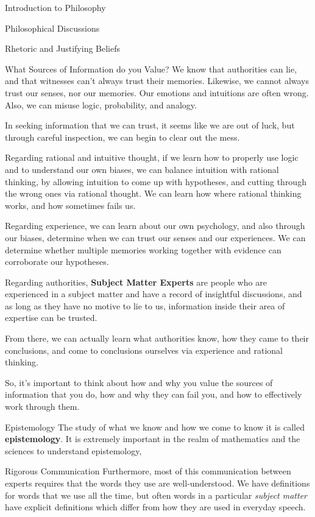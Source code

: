 \begin{chapter}{Introduction to Philosophy}
\begin{section}{Philosophical Discussions}
\begin{subsection}{Rhetoric and Justifying Beliefs}
\begin{subsubsection}{What Sources of Information do you Value?}
                We know that authorities can lie, and that witnesses can't always trust their memories. Likewise, we cannot always trust our senses, nor our memories. Our emotions and intuitions are often wrong. Also, we can misuse logic, probability, and analogy.
                    
                In seeking information that we can trust, it seems like we are out of luck, but through careful inspection, we can begin to clear out the mess.
                        
                Regarding rational and intuitive thought, if we learn how to properly use logic and to understand our own biases, we can balance intuition with rational thinking, by allowing intuition to come up with hypotheses, and cutting through the wrong ones via rational thought. We can learn how where rational thinking works, and how sometimes fails us.
                    
                Regarding experience, we can learn about our own psychology, and also through our biases, determine when we can trust our senses and our experiences. We can determine whether multiple memories working together with evidence can corroborate our hypotheses.
                    
                Regarding authorities, \textbf{Subject Matter Experts} are people who are experienced in a subject matter and have a record of insightful discussions, and as long as they have no motive to lie to us, information inside their area of expertise can be trusted.
                    
                From there, we can actually learn what authorities know, how they came to their conclusions, and come to conclusions ourselves via experience and rational thinking.
                    
                So, it's important to think about how and why you value the sources of information that you do, how and why they can fail you, and how to effectively work through them.
            \end{subsubsection}
                
            \begin{subsubsection}{Epistemology}
                The study of what we know and how we come to know it is called \textbf{epistemology}. It is extremely important in the realm of mathematics and the sciences to understand epistemology, 
            \end{subsubsection}
            \begin{subsubsection}{Rigorous Communication}
                Furthermore, most of this communication between experts requires that the words they use are well-understood. We have definitions for words that we use all the time, but often words in a particular \emph{subject matter} have explicit definitions which differ from how they are used in everyday speech.
                    

\end{subsubsection}
\end{subsection}
\end{section}
\end{chapter}
